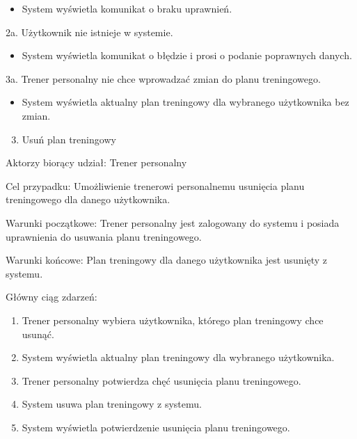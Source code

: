 \documentclass[
]{article}
\providecommand{\tightlist}{%
  \setlength{\itemsep}{0pt}\setlength{\parskip}{0pt}}
\begin{document}
\begin{itemize}
\tightlist
\item
  {System wyświetla komunikat o braku uprawnień.}
\end{itemize}

{2a. Użytkownik nie istnieje w systemie.}

\begin{itemize}
\tightlist
\item
  {System wyświetla komunikat o błędzie i prosi o podanie poprawnych
  danych.}
\end{itemize}

{3a. Trener personalny nie chce wprowadzać zmian do planu treningowego.}

\begin{itemize}
\tightlist
\item
  {System wyświetla aktualny plan treningowy dla wybranego użytkownika
  bez zmian.}
\end{itemize}

{}

\begin{enumerate}
\setcounter{enumi}{2}
\tightlist
\item
  {Usuń plan treningowy}
\end{enumerate}

{Aktorzy biorący udział: Trener personalny}

{Cel przypadku: Umożliwienie trenerowi personalnemu usunięcia planu
treningowego dla danego użytkownika.}

{Warunki początkowe: Trener personalny jest zalogowany do systemu i
posiada uprawnienia do usuwania planu treningowego.}

{Warunki końcowe: Plan treningowy dla danego użytkownika jest usunięty z
systemu.}

{Główny ciąg zdarzeń:}

\begin{enumerate}
\tightlist
\item
  {Trener personalny wybiera użytkownika, którego plan treningowy chce
  usunąć.}
\item
  {System wyświetla aktualny plan treningowy dla wybranego użytkownika.}
\item
  {Trener personalny potwierdza chęć usunięcia planu treningowego.}
\item
  {System usuwa plan treningowy z systemu.}
\item
  {System wyświetla potwierdzenie usunięcia planu treningowego.}
\end{enumerate}
\end{document}

